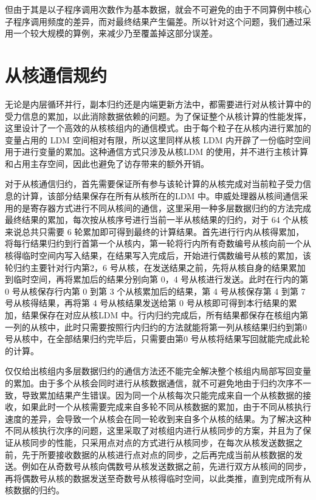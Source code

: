但由于其是以子程序调用次数作为基本数据，就会不可避免的由于不同算例中核心子程序调用频度的差异，而对最终结果产生偏差。所以针对这个问题，我们通过采用一个较大规模的算例，来减少乃至覆盖掉这部分误差。

\section{从核通信规约}
无论是内层循环并行，副本归约还是内端更新方法中，都需要进行对从核计算中的受力信息的累加，以此消除数据依赖的问题。为了保证整个从核计算的性能发挥，这里设计了一个高效的从核核组内的通信模式。由于每个粒子在从核内进行累加的变量占用的 LDM 空间相对有限，所以这里同样从核 LDM 内开辟了一份临时空间用于进行变量的累加。这种通信方式只涉及从核LDM 的使用，并不进行主核计算和占用主存空间，因此也避免了访存带来的额外开销。

对于从核通信归约，首先需要保证所有参与该轮计算的从核完成对当前粒子受力信息的计算，该部分结果保存在所有从核所在的LDM 中。申威处理器从核间通信采用的是寄存器方式进行不同从核间的通信，这里采用一种多层数据归约的方法完成最终结果的累加，每次按从核序号进行当前一半从核结果的归约，对于 64 个从核来说总共只需要 6 轮累加即可得到最终的计算结果。首先进行行内从核得累加，将每行结果归约到行首第一个从核内，第一轮将行内所有奇数编号从核向前一个从核得临时空间内写入结果，在结果写入完成后，开始进行偶数编号从核的累加，该轮归约主要针对行内第2，6 号从核，在发送结果之前，先将从核自身的结果累加到临时空间，再将累加后的结果分别向第 0，4 号从核进行发送。此时在行内的第 0 号从核保存行内第 0 到第 3 个从核累加后的结果，第 4 号从核保存第 4 到第 7 号从核得结果，再将第 4 号从核结果发送给第 0 号从核即可得到本行结果的累加，结果保存在对应从核LDM 中。行内归约完成后，所有结果都保存在核组内第一列的从核中，此时只需要按照行内归约的方法就能将第一列从核结果归约到第0 号从核中，在全部结果归约完毕后，只需要由第0 号从核将结果写回就能完成此轮的计算。

仅仅给出核组内多层数据归约的通信方法还不能完全解决整个核组内局部写回变量的累加。由于多个从核会同时进行从核数据通信，就不可避免地由于归约次序不一致，导致累加结果产生错误。因为同一个从核每次只能完成来自一个从核数据的接收，如果此时一个从核需要完成来自多轮不同从核数据的累加，由于不同从核执行速度的差异，会导致一个从核会在同一轮收到来自多个从核的结果。为了解决这种不同从核执行次序的问题，这里采取了对核组内进行从核同步的方案，并且为了保证从核同步的性能，只采用点对点的方式进行从核同步，在每次从核发送数据之前，先于所要接收数据的从核进行点对点的同步，之后再完成当前从核数据的发送。例如在从奇数号从核向偶数号从核发送数据之前，先进行双方从核间的同步，再将偶数号从核的数据发送至奇数号从核得临时空间，以此类推，直到完成所有从核数据的归约。

